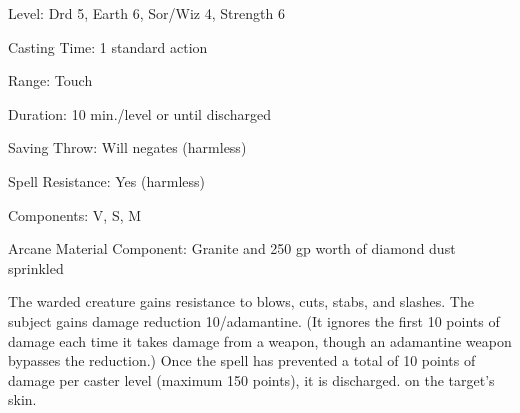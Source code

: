 
\begin{description*}
\item[Level:] Drd 5, Earth 6, Sor/Wiz 4, Strength 6
\item[Casting Time:] 1 standard action
\item[Range:] Touch
\item[Duration:] 10 min./level or until discharged
\item[Saving Throw:] Will negates (harmless)
\item[Spell Resistance:] Yes (harmless)
\item[Components:] V, S, M
\item[Arcane Material Component:] Granite and 250 gp worth of diamond dust sprinkled
\end{description*}

The warded creature gains resistance to blows, cuts, stabs, and slashes. The subject
gains damage reduction 10/adamantine. (It ignores the first 10 points of damage
each time it takes damage from a weapon, though an adamantine weapon bypasses the
reduction.) Once the spell has prevented a total of 10 points of damage per caster
level (maximum 150 points), it is discharged.
on the target's skin.